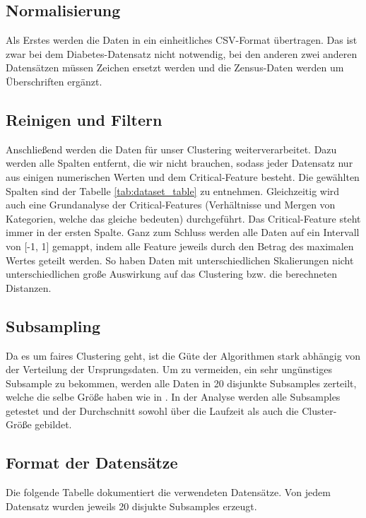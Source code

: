     \subsection{Normalisierung}
        Als Erstes werden die Daten in ein einheitliches CSV-Format übertragen. Das ist zwar bei dem Diabetes-Datensatz \cite{misc_diabetes_130_richtig} nicht notwendig, bei den anderen zwei anderen Datensätzen \cite{misc_adult_2} \cite{misc_bank_marketing_222} müssen Zeichen ersetzt werden und die Zensus-Daten werden um Überschriften ergänzt.

    \subsection{Reinigen und Filtern}
        Anschließend werden die Daten für unser Clustering weiterverarbeitet. Dazu werden alle Spalten entfernt, die wir nicht brauchen, sodass jeder Datensatz nur aus einigen numerischen Werten und dem Critical-Feature besteht. Die gewählten Spalten sind der Tabelle \ref{tab:dataset_table} zu entnehmen. Gleichzeitig wird auch eine Grundanalyse der Critical-Features (Verhältnisse und Mergen von Kategorien, welche das gleiche bedeuten) durchgeführt. Das Critical-Feature steht immer in der ersten Spalte. Ganz zum Schluss werden alle Daten auf ein Intervall von [-1, 1] gemappt, indem alle Feature jeweils durch den Betrag des maximalen Wertes geteilt werden. So haben Daten mit unterschiedlichen Skalierungen nicht unterschiedlichen große Auswirkung auf das Clustering bzw. die berechneten Distanzen.

    \subsection{Subsampling}
        Da es um faires Clustering geht, ist die Güte der Algorithmen stark abhängig von der Verteilung der Ursprungsdaten. Um zu vermeiden, ein sehr ungünstiges Subsample zu bekommen, werden alle Daten in 20 disjunkte Subsamples zerteilt, welche die selbe Größe haben wie in \cite{chierichetti2018fair}. In der Analyse werden alle Subsamples getestet und der Durchschnitt sowohl über die Laufzeit als auch die Cluster-Größe gebildet.

    \subsection{Format der Datensätze}
        Die folgende Tabelle dokumentiert die verwendeten Datensätze. Von jedem Datensatz wurden jeweils 20 disjukte Subsamples erzeugt.

